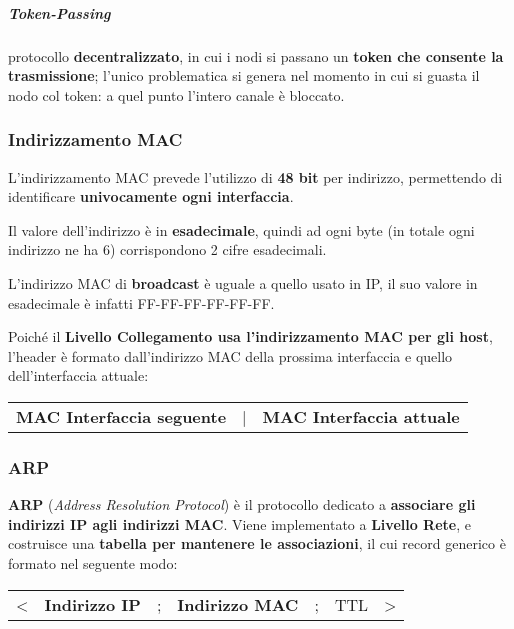 \documentclass[a4paper]{article}
\begin{document}
					\subparagraph{Token-Passing}
						protocollo \textbf{decentralizzato}, in cui i nodi si passano un \textbf{token che consente la trasmissione}; l'unico problematica si genera nel momento in cui si guasta il nodo col token: a quel punto l'intero canale è bloccato.
						
					\newpage
					
				
			\subsubsection{Indirizzamento MAC}
			\label{sec:MAC}
			
				L'indirizzamento MAC prevede l'utilizzo di \textbf{48 bit} per indirizzo, permettendo di identificare \textbf{univocamente ogni interfaccia}.
				
				Il valore dell'indirizzo è in \textbf{esadecimale}, quindi ad ogni byte (in totale ogni indirizzo ne ha 6) corrispondono 2 cifre esadecimali.
				
				L'indirizzo MAC di \textbf{broadcast} è uguale a quello usato in IP, il suo valore in esadecimale è infatti FF-FF-FF-FF-FF-FF.
				
				Poiché il \textbf{Livello Collegamento usa l'indirizzamento MAC per gli host}, l'header è formato dall'indirizzo MAC della prossima interfaccia e quello dell'interfaccia attuale:
				\begin{center}
					\begin{tabular}{ccc}
						\textbf{MAC Interfaccia seguente} & | & \textbf{MAC Interfaccia attuale}					
					\end{tabular}
				\end{center}
				
					
			\subsubsection{ARP}
			
				\textbf{ARP} (\emph{Address Resolution Protocol}) è il protocollo dedicato a \textbf{associare gli indirizzi IP agli indirizzi MAC}.
				Viene implementato a \textbf{Livello Rete}, e costruisce una \textbf{tabella per mantenere le associazioni}, il cui record generico è formato nel seguente modo:
				\begin{center}
					\begin{tabular}{ccccccc}
						< & \textbf{Indirizzo IP} & ; & \textbf{Indirizzo MAC} & ; & TTL & >					
					\end{tabular}
				\end{center}
				
\end{document}
